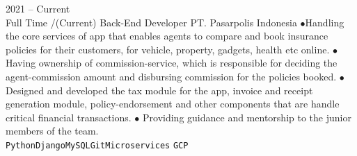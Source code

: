 \documentclass[9pt]{developercv} %
\begin{document}
\begin{entrylist}
		\entry
	{2021 -- Current\\\footnotesize{Full Time /(Current)}}
	{Back-End Developer}
	{PT. Pasarpolis Indonesia}
	{$\bullet$Handling the core services of app that enables agents to compare and book insurance policies for their customers, for vehicle, property, gadgets, health  etc online. $\bullet$ Having ownership of commission-service, which is responsible for deciding the agent-commission amount and disbursing commission for the policies booked. $\bullet$ Designed and developed the tax module for the app, invoice and receipt generation module, policy-endorsement and other components that are handle critical financial transactions. $\bullet$ Providing guidance and mentorship to the junior members of the team.\\ \texttt{Python}\slashsep\texttt{Django}\slashsep\texttt{MySQL}\slashsep\texttt{Git}\slashsep\texttt{Microservices} \slashsep\texttt{GCP}}
	

\end{entrylist}
\end{document}
